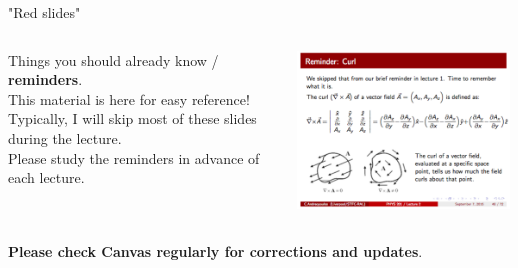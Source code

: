\begin{frame}{"Red slides"}

\begin{columns}
  \begin{column}{0.30\textwidth}
   \begin{center}
      Things you should already know / {\bf reminders}.\\
      \vspace{0.2cm}
      This material is here for easy reference!
      Typically, I will skip most of these slides during the lecture.\\
      \vspace{0.2cm}
      Please study the reminders in advance of each lecture.\\
   \end{center}
  \end{column}
  \begin{column}{0.70\textwidth}
   \begin{center}
     \includegraphics[width=0.99\textwidth]{./images/example_slides/reminder.png}\\
   \end{center}
  \end{column}
\end{columns}

\vspace{0.2cm}

\begin{center}
 {\bf Please check Canvas regularly for corrections and updates}.\\
\end{center}

\end{frame}


